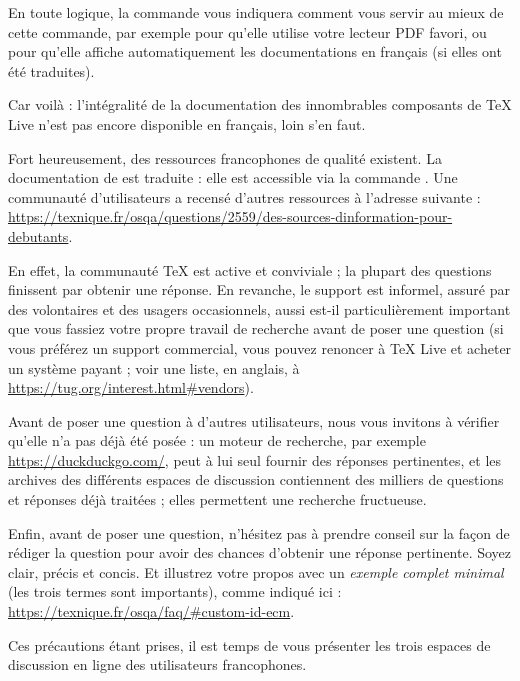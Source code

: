 \documentclass[german, english, french]{article}
\renewcommand{\TL}{\TeX{} Live\xspace}%
\begin{document}
En toute logique, la commande  vous indiquera comment vous
servir au mieux de cette commande, par exemple pour qu'elle utilise votre
lecteur PDF favori, ou pour qu'elle affiche automatiquement les documentations
en français (si elles ont été traduites).

Car voilà : l'intégralité de la documentation des innombrables composants de
\TL{} n'est pas encore disponible en français, loin s'en faut.

Fort heureusement, des ressources francophones de qualité existent.  La
documentation de \LaTeXe{} est traduite : elle est accessible via la commande
. Une communauté d'utilisateurs a recensé d'autres
ressources à l'adresse suivante :
\url{https://texnique.fr/osqa/questions/2559/des-sources-dinformation-pour-debutants}.

En effet, la communauté \TeX{} est active et conviviale ; la plupart des
questions finissent par obtenir une réponse. En revanche, le support est
informel, assuré par des volontaires et des usagers occasionnels, aussi est-il
particulièrement important que vous fassiez votre propre travail de recherche
avant de poser une question (si vous préférez un support commercial, vous pouvez
renoncer à \TL{} et acheter un système payant ; voir une liste, en anglais,
à \url{https://tug.org/interest.html#vendors}).

Avant de poser une question à d'autres utilisateurs, nous vous invitons
à vérifier qu'elle n'a pas déjà été posée : un moteur de recherche, par exemple
\url{https://duckduckgo.com/}, peut à lui seul fournir des réponses pertinentes,
et les archives des différents espaces de discussion contiennent des milliers de
questions et réponses déjà traitées ; elles permettent une recherche fructueuse.

Enfin, avant de poser une question, n'hésitez pas à prendre conseil sur la façon
de rédiger la question pour avoir des chances d'obtenir une réponse pertinente.
Soyez clair, précis et concis. Et illustrez votre propos avec un \emph{exemple
  complet minimal} (les trois termes sont importants), comme indiqué ici :
\url{https://texnique.fr/osqa/faq/#custom-id-ecm}.

Ces précautions étant prises, il est temps de vous présenter les trois espaces
de discussion en ligne des utilisateurs francophones.
\end{document}
